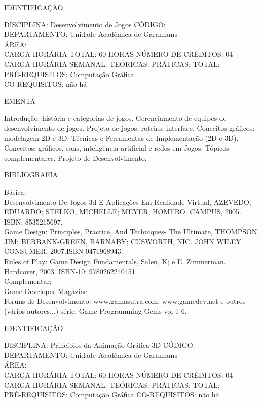 \documentclass[
	12pt,				%
	openright,			%
  oneside,     %
	a4paper,			%
	chapter=TITLE,		%
	english,			%
	french,				%
	spanish,			%
	brazil				%
	]{abntex2}
\begin{document}
\begin{apendicesenv}
\newpage IDENTIFICAÇÃO

DISCIPLINA: Desenvolvimento de Jogos CÓDIGO:\\ 
DEPARTAMENTO: Unidade Acadêmica de Garanhuns\\ 
ÁREA: \\
CARGA HORÁRIA TOTAL: 60 HORAS NÚMERO DE CRÉDITOS: 04\\
CARGA HORÁRIA SEMANAL: TEÓRICAS: PRÁTICAS: TOTAL: \\
PRÉ-REQUISITOS: Computação Gráfica\\
CO-REQUISITOS: não há

EMENTA 

Introdução: história e categorias de jogos. Gerenciamento de equipes de
desenvolvimento de jogos. Projeto de jogos: roteiro, interface.
Conceitos gráficos: modelagem 2D e 3D. Técnicas e Ferramentas de
Implementação (2D e 3D). Conceitos: gráficos, sons, inteligência
artificial e redes em Jogos. Tópicos complementares. Projeto de
Desenvolvimento.

BIBLIOGRAFIA 

Básica:\\
Desenvolvimento De Jogos 3d E Aplicações Em Realidade Virtual, AZEVEDO,
EDUARDO; STELKO, MICHELLE; MEYER, HOMERO. CAMPUS, 2005. ISBN:
8535215697.\\
Game Design: Principles, Practice, And Techniques- The Ultimate,
THOMPSON, JIM; BERBANK-GREEN, BARNABY; CUSWORTH, NIC. JOHN WILEY
CONSUMER, 2007.ISBN 0471968943.\\
Rules of Play: Game Design Fundamentals, Salen, K; e E, Zimmerman.
Hardcover, 2003. ISBN-10: 9780262240451.\\
Complementar:\\
Game Developer Magazine\\
Foruns de Desenvolvimento: www.gamasutra.com, www.gamedev.net e outros\\
(vários autores...) série: Game Programming Gems vol 1-6.

\newpage IDENTIFICAÇÃO

DISCIPLINA: Princípios da Animação Gráfica 3D CÓDIGO:\\ 
DEPARTAMENTO: Unidade Acadêmica de Garanhuns\\ 
ÁREA: \\
CARGA HORÁRIA TOTAL: 60 HORAS NÚMERO DE CRÉDITOS: 04\\
CARGA HORÁRIA SEMANAL: TEÓRICAS: PRÁTICAS: TOTAL: \\
PRÉ-REQUISITOS: Computação Gráfica
CO-REQUISITOS: não há


\end{apendicesenv}
\end{document}
